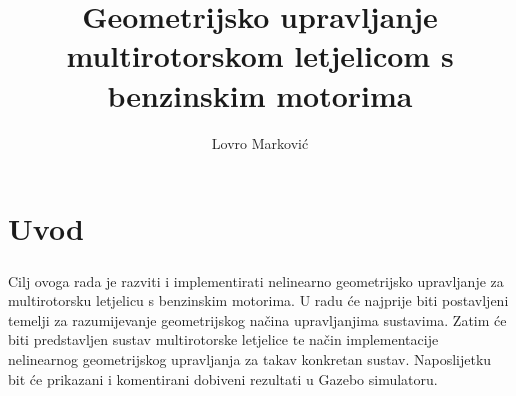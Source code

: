 \documentclass[times, utf8, diplomski]{fer}
\begin{document}
	

\title{Geometrijsko upravljanje multirotorskom letjelicom s benzinskim motorima}

\author{Lovro Marković}

\maketitle

\izvornik

\zahvala{}

\tableofcontents

\chapter{Uvod}

\paragraph{}
Cilj ovoga rada je razviti i implementirati nelinearno geometrijsko upravljanje za multirotorsku letjelicu s benzinskim motorima. U radu će najprije biti postavljeni temelji za razumijevanje geometrijskog načina upravljanjima sustavima. Zatim će biti predstavljen sustav multirotorske letjelice te način implementacije nelinearnog geometrijskog upravljanja za takav konkretan sustav. Naposlijetku bit će prikazani i komentirani dobiveni rezultati u Gazebo simulatoru. \\
\end{document}
